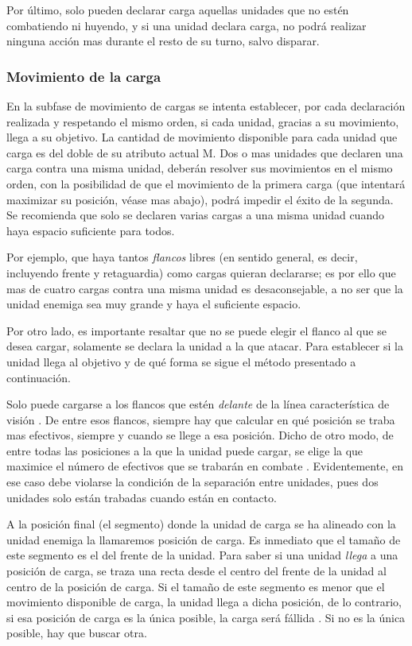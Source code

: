 Por último, solo pueden declarar carga aquellas unidades que no estén
combatiendo ni huyendo, y si una unidad declara carga, no podrá
realizar ninguna acción mas durante el resto de su turno, salvo disparar.

\subsubsection*{Movimiento de la carga}
\label{cargar}
En la subfase de movimiento de cargas se intenta establecer, por cada
declaración realizada y respetando el mismo orden, si cada unidad,
gracias a su movimiento, llega a su objetivo. La cantidad de movimiento
disponible para cada unidad que carga es del doble de su atributo
actual M. Dos o mas unidades que declaren una carga contra
una misma unidad, deberán resolver sus movimientos en el mismo orden,
con la posibilidad de que el movimiento de la primera carga (que
intentará maximizar su posición, véase mas abajo), podrá impedir el
éxito de la segunda. Se recomienda que solo se declaren varias cargas
a una misma unidad cuando haya espacio suficiente para todos.

Por ejemplo, que haya tantos \emph{flancos} libres (en sentido general, es
decir, incluyendo frente y retaguardia) como cargas quieran
declararse; es por ello que mas de cuatro cargas contra una misma
unidad es desaconsejable, a no ser que la unidad enemiga sea muy
grande y haya el suficiente espacio.

Por otro lado, es importante resaltar que no se puede elegir el flanco
al que se desea cargar, solamente se declara la unidad a la que
atacar. Para establecer si la unidad llega al objetivo y de qué forma
se sigue el método presentado a continuación.

Solo puede cargarse a los flancos que estén \emph{delante} de la línea
característica de visión . De entre esos
flancos, siempre hay que calcular en qué posición se traba mas
efectivos, siempre y cuando se llege a esa posición. Dicho de otro
modo, de entre todas las posiciones a la que la unidad puede cargar,
se elige la que maximice el número de efectivos que se trabarán en
combate . Evidentemente, en ese caso debe
violarse la condición de la separación entre unidades, pues dos
unidades solo están trabadas cuando están en contacto.

A la posición final (el segmento) donde la unidad de carga se ha alineado con la
unidad enemiga la llamaremos posición de carga. Es inmediato que el
tamaño de este segmento es el del frente de la unidad. Para saber si una
unidad \emph{llega} a una posición de carga, se traza una recta desde
el centro del frente de la unidad al centro de la posición de
carga. Si el tamaño de este segmento es menor que el movimiento
disponible de carga, la unidad llega a dicha posición, de lo
contrario, si esa posición de carga es la única posible, la carga será
fállida . Si no es la única posible, hay que buscar otra.

